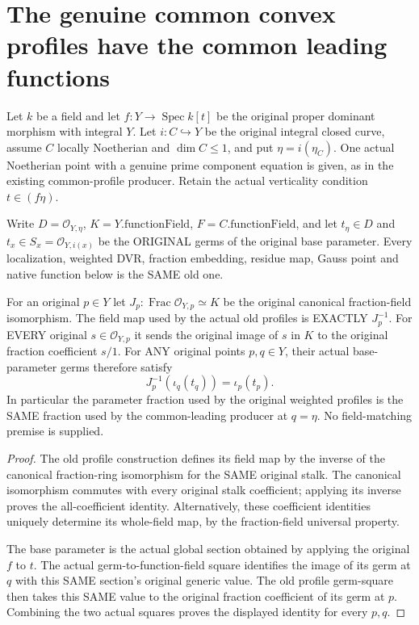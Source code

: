 \section{The genuine common convex profiles have the common leading functions}

Let $k$ be a field and let $f:Y\to\operatorname{Spec}k[t]$ be the
original proper dominant morphism with integral $Y$. Let
$i:C\hookrightarrow Y$ be the original integral closed curve, assume
$C$ locally Noetherian and $\dim C\le1$, and put $\eta=i(\eta_C)$.
One actual Noetherian point with a genuine prime component equation is
given, as in the existing common-profile producer. Retain the actual
verticality condition $t\in(f\eta)$.

Write $D=\mathcal O_{Y,\eta}$, $K=Y.\mathrm{functionField}$,
$F=C.\mathrm{functionField}$, and let $t_\eta\in D$ and
$t_x\in S_x=\mathcal O_{Y,i(x)}$ be the ORIGINAL germs of the original
base parameter. Every localization, weighted DVR, fraction embedding,
residue map, Gauss point and native function below is the SAME old one.

\begin{lemma}
\label{lem:gauss-common-leading-original-field-parameter}
\leanok
For an original $p\in Y$ let $J_p:\operatorname{Frac}\mathcal O_{Y,p}\simeq K$
be the original canonical fraction-field isomorphism. The field map
used by the actual old profiles is EXACTLY $J_p^{-1}$. For EVERY original
$s\in\mathcal O_{Y,p}$ it sends the original image of $s$ in $K$ to the
original fraction coefficient $s/1$.
For ANY original points $p,q\in Y$, their actual base-parameter germs
therefore satisfy
\[
 J_p^{-1}(\iota_q(t_q))=\iota_p(t_p).
\]
In particular the parameter fraction used by the original weighted
profiles is the SAME fraction used by the common-leading producer at
$q=\eta$. No field-matching premise is supplied.
\end{lemma}
\begin{proof}
The old profile construction defines its field map by the inverse of the
canonical fraction-ring isomorphism for the SAME original stalk. The
canonical isomorphism commutes with every original stalk coefficient;
applying its inverse proves the all-coefficient identity. Alternatively,
these coefficient identities uniquely determine its whole-field map,
by the fraction-field universal property.

The base parameter is the actual global section obtained by applying
the original $f$ to $t$. The actual germ-to-function-field square identifies
the image of its germ at $q$ with this SAME section's original generic
value. The old profile germ-square then takes this SAME value to the
original fraction coefficient of its germ at $p$. Combining the two
actual squares proves the displayed identity for every $p,q$.
\end{proof}


